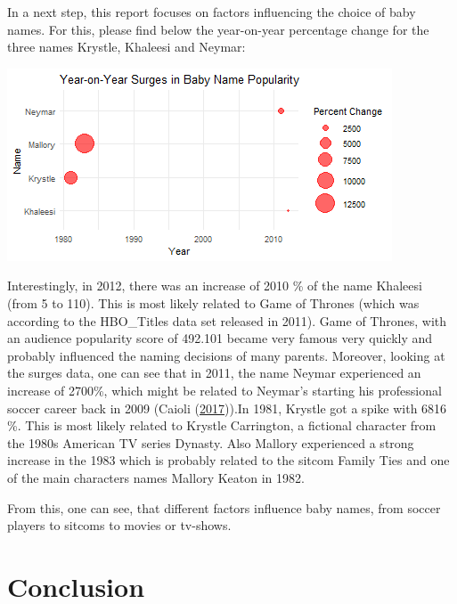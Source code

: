 \documentclass[11pt,preprint, authoryear]{elsarticle}
\let\origfigure\figure
\let\endorigfigure\endfigure
\renewenvironment{figure}[1][2] {
    \expandafter\origfigure\expandafter[H]
} {
    \endorigfigure
}
\numberwithin{equation}{section}
\numberwithin{figure}{section}
\numberwithin{table}{section}
\begin{document}
In a next step, this report focuses on factors influencing the choice of
baby names. For this, please find below the year-on-year percentage
change for the three names Krystle, Khaleesi and Neymar:

\begin{figure}[H]

{\centering \includegraphics{Question1_files/figure-latex/Figure2-1} 

}

\caption{Surges in Baby Names \label{Figure2}}\label{fig:Figure2}
\end{figure}

Interestingly, in 2012, there was an increase of 2010 \% of the name
Khaleesi (from 5 to 110). This is most likely related to Game of Thrones
(which was according to the HBO\_Titles data set released in 2011). Game
of Thrones, with an audience popularity score of 492.101 became very
famous very quickly and probably influenced the naming decisions of many
parents. Moreover, looking at the surges data, one can see that in 2011,
the name Neymar experienced an increase of 2700\%, which might be
related to Neymar's starting his professional soccer career back in 2009
(Caioli (\protect\hyperlink{ref-caioli2017neymar}{2017})).In 1981,
Krystle got a spike with 6816 \%. This is most likely related to Krystle
Carrington, a fictional character from the 1980s American TV series
Dynasty. Also Mallory experienced a strong increase in the 1983 which is
probably related to the sitcom Family Ties and one of the main
characters names Mallory Keaton in 1982.

From this, one can see, that different factors influence baby names,
from soccer players to sitcoms to movies or tv-shows.

\hypertarget{conclusion}{%
\section{Conclusion}\label{conclusion}}
\end{document}
